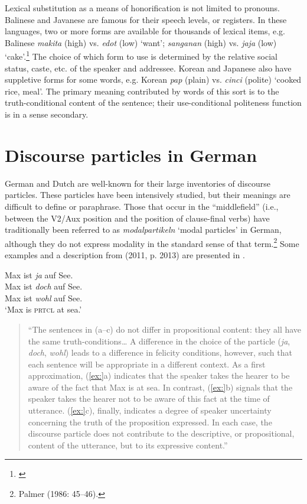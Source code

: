 Lexical substitution as a means of honorification is not limited to pronouns. Balinese and Javanese are famous for their speech levels, or registers. In these languages, two or more forms are available for thousands of lexical items, e.g. Balinese \textit{makita} (high) vs. \textit{edot} (low) ‘want’; \textit{sanganan} (high) vs. \textit{jaja} (low) ‘cake’.\footnote{\citet{Arka2005}} The choice of which form to use is determined by the relative social status, caste, etc. of the speaker and addressee. Korean and Japanese also have suppletive forms for some words, e.g. Korean \textit{pap} (plain) vs. \textit{cinci} (polite) ‘cooked rice, meal’. The primary meaning contributed by words of this sort is to the truth-conditional content of the sentence; their use-conditional politeness function is in a sense secondary.


\section{Discourse particles in German}\label{sec:} %

German and Dutch are well-known for their large inventories of discourse particles. These particles have been intensively studied, but their meanings are difficult to define or paraphrase. Those that occur in the “middlefield” (i.e., between the V2/Aux position and the position of clause-final verbs) have traditionally been referred to as \textit{modalpartikeln} ‘modal particles’ in German, although they do not express modality in the standard sense of that term.\footnote{Palmer (1986: 45–46).} Some examples and a description from \citeauthor{Zimmermann2011} (2011, p. 2013) are presented in .


\ea
\ea Max ist \textit{ja} auf See.\\
\ex Max ist \textit{doch} auf See.\\
\ex Max ist \textit{wohl} auf See.\\
‘Max is \textsc{prtcl} at sea.’
                       \z

\begin{quote}
“The sentences in (a–c) do not differ in propositional content: they all have the same truth-conditions… A difference in the choice of the particle (\textit{ja}, \textit{doch}, \textit{wohl}) leads to a difference in felicity conditions, however, such that each sentence will be appropriate in a different context. As a first approximation, (\ref{ex:}a) indicates that the speaker takes the hearer to be aware of the fact that Max is at sea. In contrast, (\ref{ex:}b) signals that the speaker takes the hearer not to be aware of this fact at the time of utterance. (\ref{ex:}c), finally, indicates a degree of speaker uncertainty concerning the truth of the proposition expressed. In each case, the discourse particle does not contribute to the descriptive, or propositional, content of the utterance, but to its expressive content.”
\end{quote}
\z


